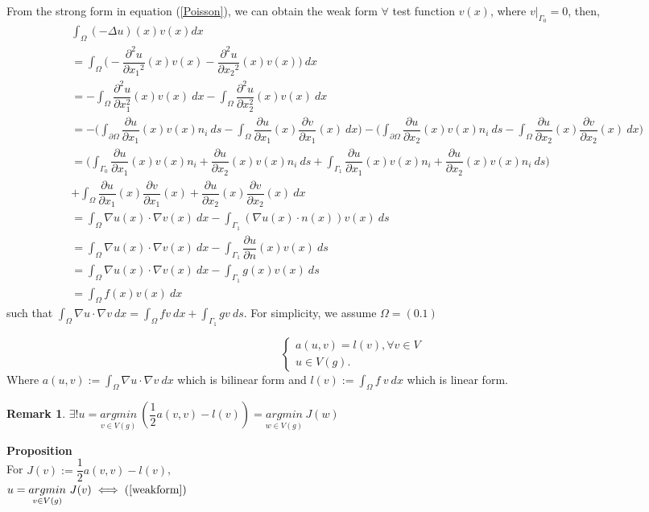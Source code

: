 \documentclass[]{report}
\newtheorem{remark}{Remark}[section]
\begin{document}
From the strong form in equation (\ref{Poisson}), we can obtain the weak form
$ \forall $ test function $ v(x) $, where $ v|_{\Gamma_0} = 0 $, then,
\begin{align*}
	&\int_\Omega (-\Delta u)(x) v(x) dx\\
	&= \int_\Omega \Big(-\dfrac{\partial^2u}{\partial{x_1}^2} (x) v(x) -\dfrac{\partial^2u}{\partial{x_2}^2} (x) v(x) \Big) \ dx \\
	&= - \int_{\Omega} \dfrac{\partial^{2}u}{\partial x_{1}^{2}}  (x) v(x) \ dx - \int_{\Omega} \dfrac{\partial^{2} u}{\partial x_{2}^{2}} (x) v(x) \ dx\\
	&= - \Big( \int_{\partial \Omega} \dfrac{\partial u}{\partial x_{1}} (x) v(x) n_{i} \ ds - \int_{\Omega} \dfrac{\partial u}{\partial x_{1}} (x) \dfrac{\partial v}{\partial x_{1}} (x) \ dx \Big) - \Big( \int_{\partial \Omega} \dfrac{\partial u}{\partial x_{2}} (x) v(x) n_{i} \ ds - \int_{\Omega} \dfrac{\partial u}{\partial x_{2}} (x) \dfrac{\partial v}{\partial x_{2}} (x) \ dx \Big)\\
	&= \Big( \int_{\Gamma_0} \dfrac{\partial u}{\partial x_{1}} (x) v(x) n_{i} + \dfrac{\partial u}{\partial x_{2}} (x) v(x) n_{i} \ ds + \int_{\Gamma_1} \dfrac{\partial u}{\partial x_{1}} (x) v(x) n_{i} + \dfrac{\partial u}{\partial x_{2}} (x) v(x) n_{i} \ ds \Big) \\
	&+ \int_{\Omega} \dfrac{\partial u}{\partial x_{1}} (x) \dfrac{\partial v}{\partial x_{1}} (x) + \dfrac{\partial u}{\partial x_{2}} (x) \dfrac{\partial v}{\partial x_{2}} (x) \ dx \\
	&= \int_{\Omega} \nabla u(x) \cdot \nabla v(x) \ dx - \int_{\Gamma_1} (\nabla u(x) \cdot n(x)) v(x) \ ds \\
	&= \int_{\Omega} \nabla u(x) \cdot \nabla v(x) \ dx - \int_{\Gamma_1} \dfrac{\partial u}{\partial n} (x) v(x) \ ds \\
	&= \int_{\Omega} \nabla u(x) \cdot \nabla v(x) \ dx - \int_{\Gamma_1} g(x) v(x) \ ds\\
	&= \int_{\Omega} f(x) v(x) \ dx
\end{align*}
such that $ \int_{\Omega} \nabla u \cdot \nabla v \ dx = \int_{\Omega} f v \ dx + \int_{\Gamma_1} g v \ ds $. For simplicity, we assume $ \Omega = (0.1) $

\begin{equation}\label{weakform}
\begin{cases}
a(u,v) = l(v), \forall v \in V \\
u \in V(g).
\end{cases}
\end{equation}
Where $ a(u,v) := \int_{\Omega} \nabla u \cdot \nabla v \ dx$ which is bilinear form and $ l(v) := \int_{\Omega} f \ v \ dx $ which is linear form.
\begin{remark}
	$ \exists ! u = \underset{v \in V(g)}{argmin} \ (\dfrac{1}{2} a(v,v)-l(v)) = \underset{w \in V(g)}{argmin} \ J(w)$
\end{remark}
\textbf{Proposition}\\
For $ J(v) := \dfrac{1}{2} a(v,v) -l (v) $,\\
$ u = \underset{v \in V(g)}{argmin} \ J(v) \iff (\ref{weakform}) $
\end{document}

